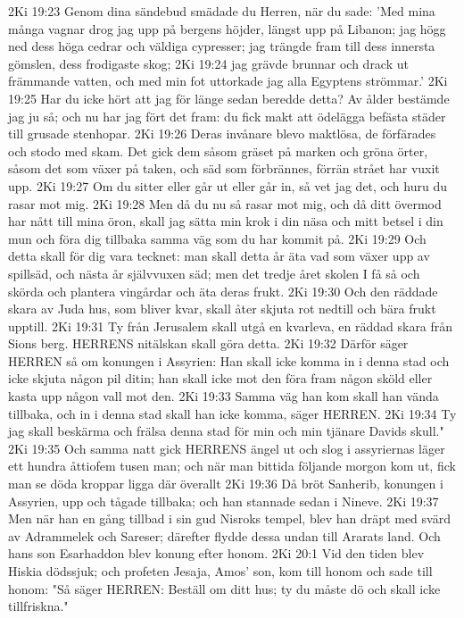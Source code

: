 2Ki 19:23  Genom dina sändebud smädade du Herren, när du sade: 'Med mina många vagnar drog jag upp på bergens höjder, längst upp på Libanon; jag högg ned dess höga cedrar och väldiga cypresser; jag trängde fram till dess innersta gömslen, dess frodigaste skog;
2Ki 19:24  jag grävde brunnar och drack ut främmande vatten, och med min fot uttorkade jag alla Egyptens strömmar.'
2Ki 19:25  Har du icke hört att jag för länge sedan beredde detta? Av ålder bestämde jag ju så; och nu har jag fört det fram: du fick makt att ödelägga befästa städer till grusade stenhopar.
2Ki 19:26  Deras invånare blevo maktlösa, de förfärades och stodo med skam. Det gick dem såsom gräset på marken och gröna örter, såsom det som växer på taken, och säd som förbrännes, förrän strået har vuxit upp.
2Ki 19:27  Om du sitter eller går ut eller går in, så vet jag det, och huru du rasar mot mig.
2Ki 19:28  Men då du nu så rasar mot mig, och då ditt övermod har nått till mina öron, skall jag sätta min krok i din näsa och mitt betsel i din mun och föra dig tillbaka samma väg som du har kommit på.
2Ki 19:29  Och detta skall för dig vara tecknet: man skall detta år äta vad som växer upp av spillsäd, och nästa år självvuxen säd; men det tredje året skolen I få så och skörda och plantera vingårdar och äta deras frukt.
2Ki 19:30  Och den räddade skara av Juda hus, som bliver kvar, skall åter skjuta rot nedtill och bära frukt upptill.
2Ki 19:31  Ty från Jerusalem skall utgå en kvarleva, en räddad skara från Sions berg. HERRENS nitälskan skall göra detta.
2Ki 19:32  Därför säger HERREN så om konungen i Assyrien: Han skall icke komma in i denna stad och icke skjuta någon pil ditin; han skall icke mot den föra fram någon sköld eller kasta upp någon vall mot den.
2Ki 19:33  Samma väg han kom skall han vända tillbaka, och in i denna stad skall han icke komma, säger HERREN.
2Ki 19:34  Ty jag skall beskärma och frälsa denna stad för min och min tjänare Davids skull."
2Ki 19:35  Och samma natt gick HERRENS ängel ut och slog i assyriernas läger ett hundra åttiofem tusen man; och när man bittida följande morgon kom ut, fick man se döda kroppar ligga där överallt
2Ki 19:36  Då bröt Sanherib, konungen i Assyrien, upp och tågade tillbaka; och han stannade sedan i Nineve.
2Ki 19:37  Men när han en gång tillbad i sin gud Nisroks tempel, blev han dräpt med svärd av Adrammelek och Sareser; därefter flydde dessa undan till Ararats land. Och hans son Esarhaddon blev konung efter honom.
2Ki 20:1  Vid den tiden blev Hiskia dödssjuk; och profeten Jesaja, Amos' son, kom till honom och sade till honom: "Så säger HERREN: Beställ om ditt hus; ty du måste dö och skall icke tillfriskna."
